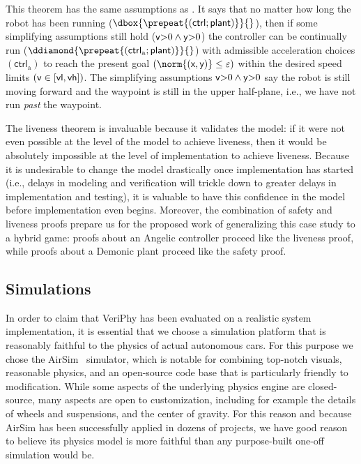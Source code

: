 \documentclass[12pt]{cmuthesis}
\theoremstyle{definition}
\theoremstyle{remark}
\newcommand{\xgvar}{\textsf{x}}
\newcommand{\ygvar}{\textsf{y}}
\newcommand{\yvar}{\textsf{y}}
\newcommand{\vlvar}{\textsf{vl}}
\newcommand{\vhvar}{\textsf{vh}}
\newcommand{\vvar}{{\sf v}\xspace}
\newcommand{\ctrl}{\textsf{ctrl}\xspace}
\newcommand{\ctrlliv}{\ctrl_{\text{a}}}
\newcommand{\plant}{\textsf{plant}\xspace}
\newcommand{\enorm}[1]{\norm{#1}}
\newcommand{\rref}[2][]{\prettyref{#2}}
\newcommand{\VeriPhy}{VeriPhy\xspace}
\begin{document}
This theorem has the same assumptions as \rref{thm:safe}. 
It says that no matter how long the robot has been running ($\dbox{\prepeat{(\ctrl;\plant)}}{}$), 
then if some simplifying assumptions still hold ($\vvar{>}0\land\yvar{>}0$) 
the controller can be continually run ($\ddiamond{\prepeat{(\ctrlliv;\plant)}}{}$) with admissible acceleration choices $(\ctrlliv)$ to reach the present goal \((\enorm{(\xgvar,\ygvar)} \leq \veps)\) within the desired speed limits \((\vvar \in [\vlvar,\vhvar])\).
The simplifying assumptions $\vvar{>}0\land\yvar{>}0$ say the robot is still moving forward and the waypoint is still in the upper half-plane, i.e., we have not run \emph{past} the waypoint.

The liveness theorem is invaluable because it validates the \dL model: if it were not even possible at the level of the \dL model to achieve liveness, then it would be absolutely impossible at the level of implementation to achieve liveness.
Because it is undesirable to change the model drastically once implementation has started (i.e., delays in modeling and verification will trickle down to greater delays in implementation and testing), it is valuable to have this confidence in the model before implementation even begins.
Moreover, the combination of safety and liveness proofs prepare us for the proposed work of generalizing this case study to a hybrid game: proofs about an Angelic controller proceed like the liveness proof, while proofs about a Demonic plant proceed like the safety proof.

\subsection{Simulations}
In order to claim that \VeriPhy has been evaluated on a realistic system implementation, it is essential that we choose a simulation platform that is reasonably faithful to the physics of actual autonomous cars.
For this purpose we chose the AirSim~\cite{shah2018airsim} simulator, which is notable for combining top-notch visuals, reasonable physics, and an open-source code base that is particularly friendly to modification.
While some aspects of the underlying physics engine are closed-source, many aspects are open to customization, including for example the details of wheels and suspensions, and the center of gravity.
For this reason and because AirSim has been successfully applied in dozens of projects, we have good reason to believe its physics model is more faithful than any purpose-built one-off simulation would be.
\end{document}
